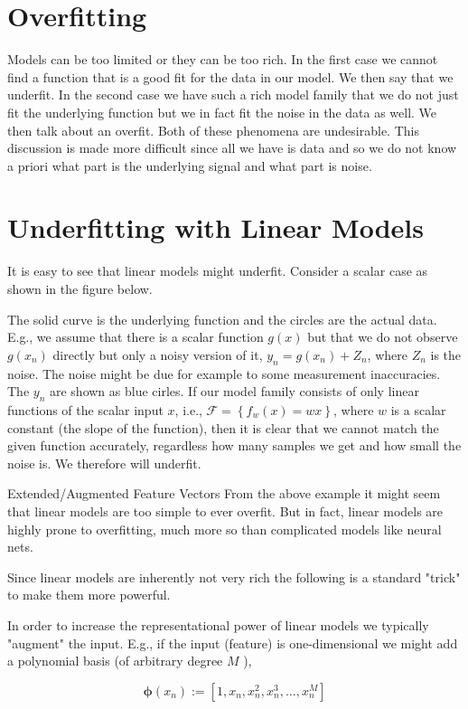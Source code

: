 
\section*{Overfitting}
Models can be too limited or they can be too rich. In the first case we cannot find a function that is a good fit for the data in our model. We then say that we underfit. In the second case we have such a rich model family that we do not just fit the underlying function but we in fact fit the noise in the data as well. We then talk about an overfit. Both of these phenomena are undesirable. This discussion is made more difficult since all we have is data and so we do not know a priori what part is the underlying signal and what part is noise.

\section*{Underfitting with Linear Models}
It is easy to see that linear models might underfit. Consider a scalar case as shown in the figure below.


The solid curve is the underlying function and the circles are the actual data. E.g., we assume that there is a scalar function $g(x)$ but that we do not observe $g\left(x_{n}\right)$ directly but only a noisy version of it, $y_{n}=g\left(x_{n}\right)+Z_{n}$, where $Z_{n}$ is
the noise. The noise might be due for example to some measurement inaccuracies. The $y_{n}$ are shown as blue cirles. If our model family consists of only linear functions of the scalar input $x$, i.e., $\mathcal{F}=\left\{f_{w}(x)=w x\right\}$, where $w$ is a scalar constant (the slope of the function), then it is clear that we cannot match the given function accurately, regardless how many samples we get and how small the noise is. We therefore will underfit.

Extended/Augmented Feature Vectors From the above example it might seem that linear models are too simple to ever overfit. But in fact, linear models are highly prone to overfitting, much more so than complicated models like neural nets.

Since linear models are inherently not very rich the following is a standard "trick" to make them more powerful.

In order to increase the representational power of linear models we typically "augment" the input. E.g., if the input (feature) is one-dimensional we might add a polynomial basis (of arbitrary degree $M$ ),

$$
\boldsymbol{\phi}\left(x_{n}\right):=\left[1, x_{n}, x_{n}^{2}, x_{n}^{3}, \ldots, x_{n}^{M}\right]
$$

